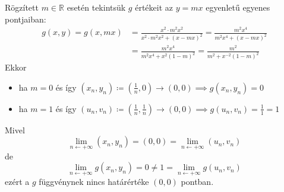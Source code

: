 \documentclass[a4paper,12pt]{article}
\theoremstyle{definition}
\begin{document}
\begin{question}
\begin{tasks}
			Rögzített $m \in \mathbb{R}$ esetén tekintsük $g$ értékeit az $y = mx$ egyenletű egyenes pontjaiban:
			\begin{align*}
				g(x,y)=g(x,mx)&=\frac{x^2 \cdot m^2x^2}{x^2 \cdot m^2x^2 + (x - mx)^2} = \frac{m^2x^4}{m^2x^4 + (x-mx)^2} \\
				&= \frac{m^2x^4}{m^2x^4+x^2(1-m)^2} = \frac{m^2}{m^2 + x^{-2}(1-m)^2}
			\end{align*}
			Ekkor
			\begin{itemize}
				\item ha $m=0$ és így $(x_n,y_n) \coloneq \left( \frac{1}{n},0 \right) \rightarrow (0,0) \implies g(x_n,y_n) = 0$
				\item ha $m=1$ és így $(u_n,v_n) \coloneq \left( \frac{1}{n}, \frac{1}{n} \right) \rightarrow (0,0) \implies g(u_n,v_n) = \frac{1}{1} = 1$ 
			\end{itemize}
			Mivel
			\[ \lim\limits_{n \leftarrow +\infty}{(x_n,y_n)}
			= (0,0) =
			\lim\limits_{n \leftarrow +\infty}{(u_n,v_n)} \]
			de
			\[ \lim\limits_{n \leftarrow +\infty}{g(x_n,y_n)}
			= 0 \ne 1 =
			\lim\limits_{n \leftarrow +\infty}{g(u_n,v_n)} \]
			ezért a $g$ függvénynek nincs határértéke $(0,0)$ pontban.
		\end{tasks}
	\end{question}
	\newpage
\end{document}
